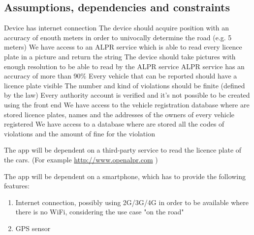 \subsection{Assumptions, dependencies and constraints}
\begin{enumerate}
\dom{}  Device has internet connection
 The device should acquire position with an accuracy of enouth meters in order to univocally determine the road (e.g. 5 meters)
\dom{} We have access to an ALPR service which is able to read every licence plate in a picture and return the string
 The device should take pictures with enough resolution to be able to read by the ALPR service
 ALPR service has an accuracy of more than 90\%
 Every vehicle that can be reported should have a licence plate visible
 The number and kind of violations should be finite (defined by the law)
 Every authority account is verified and it's not possible to be created using the front end
 We have access to the vehicle registration database where are stored licence plates, names and the addresses of the owners of every vehicle registered
 We have access to a database where are stored all the codes of violations and the amount of fine for the violation

\end{enumerate}

The app will be dependent on a third-party service to read the licence plate of the cars. (For example \url{http://www.openalpr.com} )


The app will be dependent on a smartphone, which has to provide the following features:
\begin{enumerate}
  \item Internet connection, possibly using 2G/3G/4G in order to be available where there is no WiFi, considering the use case "on the road"
  \item GPS sensor
\end{enumerate}
